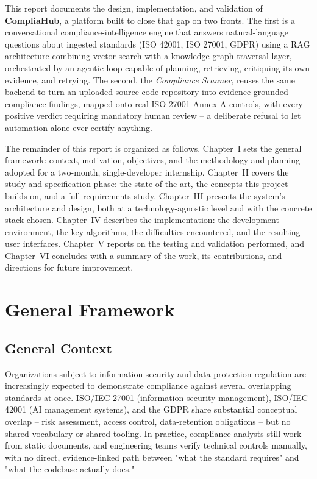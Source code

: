 \documentclass[12pt,a4paper]{report}
\begin{document}
This report documents the design, implementation, and validation of
\textbf{CompliaHub}, a platform built to close that gap on two fronts. The
first is a conversational compliance-intelligence engine that answers
natural-language questions about ingested standards (ISO 42001, ISO 27001,
\ac{GDPR}) using a \ac{RAG} architecture combining vector search with a
knowledge-graph traversal layer, orchestrated by an agentic loop capable of
planning, retrieving, critiquing its own evidence, and retrying. The second,
the \emph{Compliance Scanner}, reuses the same backend to turn an uploaded
source-code repository into evidence-grounded compliance findings, mapped
onto real ISO 27001 Annex A controls, with every positive verdict requiring
mandatory human review -- a deliberate refusal to let automation alone ever
certify anything.

The remainder of this report is organized as follows. Chapter~I sets the
general framework: context, motivation, objectives, and the methodology and
planning adopted for a two-month, single-developer internship. Chapter~II
covers the study and specification phase: the state of the art, the concepts
this project builds on, and a full requirements study. Chapter~III presents
the system's architecture and design, both at a technology-agnostic level
and with the concrete stack chosen. Chapter~IV describes the implementation:
the development environment, the key algorithms, the difficulties
encountered, and the resulting user interfaces. Chapter~V reports on the
testing and validation performed, and Chapter~VI concludes with a summary of
the work, its contributions, and directions for future improvement.

\chapter{General Framework}

\section{General Context}

Organizations subject to information-security and data-protection
regulation are increasingly expected to demonstrate compliance against
several overlapping standards at once. ISO/IEC 27001 (information security
management), ISO/IEC 42001 (AI management systems), and the \ac{GDPR} share
substantial conceptual overlap -- risk assessment, access control,
data-retention obligations -- but no shared vocabulary or shared tooling.
In practice, compliance analysts still work from static documents, and
engineering teams verify technical controls manually, with no direct,
evidence-linked path between "what the standard requires" and "what the
codebase actually does."
\end{document}
